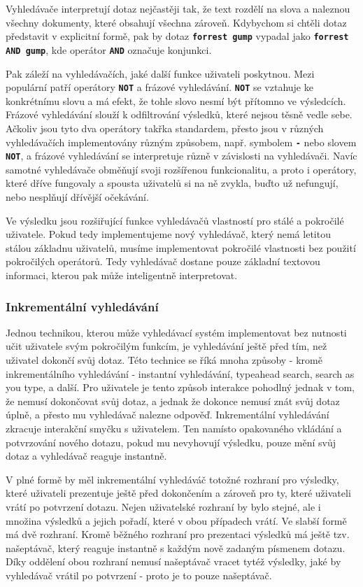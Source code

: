 \documentclass[11pt,letterpaper,oneside,openright]{book}
\newcommand{\bftt}[1]{\texttt{\textbf{#1}}}
\begin{document}
Vyhledávače interpretují dotaz nejčastěji tak, že text rozdělí na slova a
naleznou všechny dokumenty, které obsahují všechna zároveň. Kdybychom si chtěli
dotaz představit v explicitní formě, pak by dotaz \bftt{forrest gump} vypadal
jako \bftt{forrest AND gump}, kde operátor \bftt{AND} označuje konjunkci.

Pak záleží na vyhledávačích, jaké další funkce uživateli poskytnou. Mezi
populární patří operátory \bftt{NOT} a frázové vyhledávání. \bftt{NOT} se
vztahuje ke konkrétnímu slovu a má efekt, že tohle slovo nesmí být přítomno ve
výsledcích. Frázové vyhledávání slouží k odfiltrování výsledků, které nejsou
těsně vedle sebe. Ačkoliv jsou tyto dva operátory takřka standardem, přesto
jsou v různých vyhledávačích implementovány různým způsobem, např. symbolem
\bftt{-} nebo slovem \bftt{NOT}, a frázové vyhledávání se interpretuje různě v
závislosti na vyhledávači. Navíc samotné vyhledávače obměňují svoji rozšířenou
funkcionalitu, a proto i operátory, které dříve fungovaly a spousta uživatelů
si na ně zvykla, buďto už nefungují, nebo nesplňují dřívější očekávání.

Ve výsledku jsou rozšiřující funkce vyhledávačů vlastností pro stálé a
pokročilé uživatele. Pokud tedy implementujeme nový vyhledávač, který nemá
letitou stálou základnu uživatelů, musíme implementovat pokročilé vlastnosti
bez použití pokročilých operátorů. Tedy vyhledávač dostane pouze základní
textovou informaci, kterou pak může inteligentně interpretovat.

\subsubsection{Inkrementální vyhledávání} \label{sec:inkrementalni_vyhledavani}
Jednou technikou, kterou může vyhledávací systém implementovat bez nutnosti
učit uživatele svým pokročilým funkcím, je vyhledávání ještě před tím, než
uživatel dokončí svůj dotaz. Této technice se říká mnoha způsoby - kromě
inkrementálního vyhledávání - instantní vyhledávání, typeahead search, search
as you type, a další. Pro uživatele je tento způsob interakce pohodlný jednak v
tom, že nemusí dokončovat svůj dotaz, a jednak že dokonce nemusí znát svůj
dotaz úplně, a přesto mu vyhledávač nalezne odpověď. Inkrementální vyhledávání
zkracuje interakční smyčku s uživatelem. Ten namísto opakovaného vkládání a
potvrzování nového dotazu, pokud mu nevyhovují výsledku, pouze mění svůj dotaz
a vyhledávač reaguje instantně.

V plné formě by měl inkrementální vyhledáváč totožné rozhraní pro výsledky,
které uživateli prezentuje ještě před dokončením a zároveň pro ty, které
uživateli vrátí po potvrzení dotazu. Nejen uživatelské rozhraní by bylo stejné,
ale i množina výsledků a jejich pořadí, které v obou případech vrátí. Ve slabší
formě má dvě rozhraní. Kromě běžného rozhraní pro prezentaci výsledků má ještě
tzv. našeptávač, který reaguje instantně s každým nově zadaným písmenem dotazu.
Díky oddělení obou rozhraní nemusí našeptávač vracet tytéž výsledky, jaké by
vyhledávač vrátil po potvrzení - proto je to pouze našeptávač.
\end{document}
